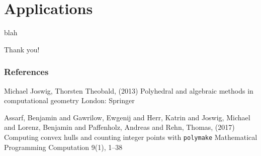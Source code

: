 \documentclass[9pt]{beamer}
\theoremstyle{definition}
\begin{document}
\section{Applications}

\begin{frame}[fragile]{}
  blah
\end{frame}



\begin{frame}[fragile]
  \begin{center}
    Thank you!
  \end{center}
\end{frame}

\begin{frame}
  \frametitle{References}
  \footnotesize{
    \begin{thebibliography}{99} %
     Michael Joswig, Thorsten Theobald, (2013)
      \newblock Polyhedral and algebraic methods in computational geometry
      \newblock London: Springer

     Assarf, Benjamin and Gawrilow, Ewgenij and Herr, Katrin and Joswig, Michael and Lorenz, Benjamin and Paffenholz, Andreas and Rehn, Thomas, (2017)
      \newblock Computing convex hulls and counting integer points with \texttt{polymake}
      \newblock Mathematical Programming Computation 9(1), 1--38 



    \end{thebibliography}
  }
\end{frame}

\end{document}
